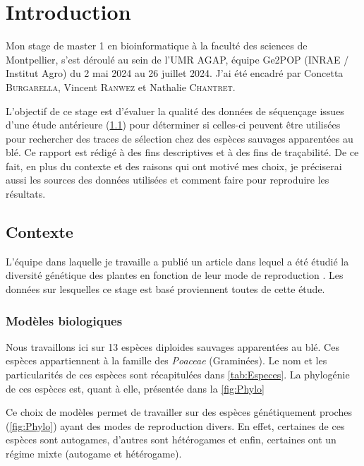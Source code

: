 \documentclass[../main]{subfiles} %
\begin{document}
\addto\extrasfrench{\protected\edef:{\unexpanded\expandafter{:}}}



\section{Introduction}

Mon stage de master 1 en bioinformatique à la faculté des sciences de Montpellier, s’est déroulé au sein de 
l’UMR AGAP, équipe Ge2POP (INRAE / Institut Agro) du 2 mai 2024 au 26 juillet 2024. J’ai été encadré par Concetta \textsc{Burgarella}, Vincent \textsc{Ranwez} et Nathalie \textsc{Chantret}. 

L’objectif de ce stage est d’évaluer la qualité des données de \gls{séquençage} issues d’une étude antérieure (\cref{Contexte}) pour déterminer si celles-ci peuvent être utilisées pour rechercher des traces de sélection chez des espèces sauvages apparentées au blé.  Ce rapport est rédigé à des fins descriptives et à des fins de traçabilité. De ce fait,  en plus du contexte et des raisons qui ont motivé mes choix, je préciserai aussi les sources des données utilisées et comment faire pour reproduire les résultats.

\subsection{Contexte}
\label{Contexte}
L’équipe dans laquelle je travaille a publié un article dans lequel a été étudié la diversité génétique des plantes en fonction de leur mode de reproduction \cite{burgarella_mating_2024}. Les données sur lesquelles ce stage est basé proviennent toutes de cette étude.

\subsubsection{Modèles biologiques}
\label{model_bio}
Nous travaillons ici sur 13 espèces \glspl{diploide} sauvages apparentées au blé. Ces espèces appartiennent à la famille des \textit{Poaceae} (Graminées). Le nom et les particularités de ces espèces sont récapitulées dans \cref{tab:Especes}. La \gls{phylogénie} de ces espèces est, quant à elle, présentée dans la \cref{fig:Phylo}




Ce choix de modèles permet de travailler sur des espèces génétiquement proches (\cref{fig:Phylo}) ayant des modes de reproduction divers. En effet, certaines de ces espèces sont \glspl{autogame}, d’autres sont \glspl{hétérogame} et enfin, certaines ont un régime mixte (\gls{autogame} et \gls{hétérogame}).
\end{document}
